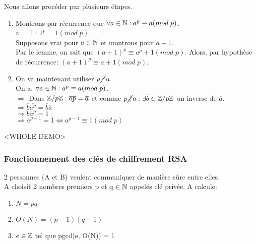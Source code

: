 \begin{demo}
Nous allons procéder par plusieurs étapes.\\

\begin{enumerate}
	\item Montrons par récurrence que $\forall a \in \mathbb{N}: a^p \equiv a(mod\;p)$.\\
	a = 1 : $1^p = 1(mod\;p)$\\
	Supposons vrai pour $a \in \mathbb{N}$ et montrons pour $a+1$.\\
	Par le lemme, on sait que $(a+1)^p \equiv a^p + 1(mod\;p)$. Alors, par hypothèse de récurrence: $(a+1)^p \equiv a + 1(mod\;p)$.\\
	\item On va maintenant utiliser $p\cancel{\;|\;}a$.\\
	On a: $\forall a \in \mathbb{N}: a^p \equiv a(mod\;p)$.\\
	$\Rightarrow$ Dans $\mathbb{Z}/p\mathbb{Z}: \overline{ap}=\overline{a}$ et comme $p\cancel{\;|\;}a: \exists \overline{b} \in \mathbb{Z}/p\mathbb{Z}$ un inverse de $\overline{a}$.\\
	$\Rightarrow \overline{b}\overline{a^p} = \overline{b}\overline{a}$\\
	$\Rightarrow \overline{b}\overline{a}^p = \overline{1}$\\
	$\Rightarrow \overline{a}^{p-1} = \overline{1} \Leftrightarrow a^{p-1} \equiv 1(mod\;p)$\\ 

\end{enumerate}
\end{demo}

\begin{demo} [du Lemme]
<WHOLE DEMO>
\end{demo}

\subsubsection{Fonctionnement des clés de chiffrement RSA}

2 personnes (A et B) veulent communiquer de manière sûre entre elles.\\

A choisit 2 nombres premiers p et q $\in \mathbb{N}$ appelés clé privée. A calcule:\\

\begin{enumerate}
\item $N = pq$
\item $O(N) = (p-1)(q-1)$
\item $e \in \mathbb{Z}$ tel que pgcd(e, O(N)) = 1
\end{enumerate}

